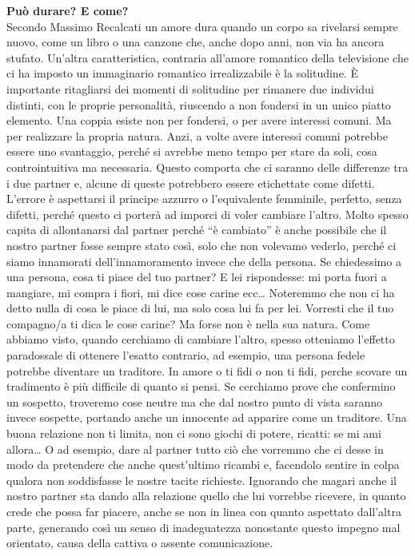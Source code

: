 \documentclass[12pt]{book} %
\begin{document}
\noindent \textbf{\large Può durare? E come?} \\
Secondo Massimo Recalcati un amore dura quando un corpo sa rivelarsi sempre nuovo, come un libro o una canzone che,
anche dopo anni, non via ha ancora stufato. Un'altra caratteristica, contraria
all'amore romantico della televisione che ci ha imposto un immaginario romantico irrealizzabile è
la solitudine. È importante ritagliarsi dei momenti di solitudine per rimanere due individui distinti, con le proprie
personalità, riuscendo a non fondersi in un unico piatto elemento. Una coppia esiste non per fondersi, o per avere
interessi comuni. Ma per realizzare la propria natura. Anzi, a volte avere interessi comuni potrebbe essere uno
svantaggio, perché si avrebbe meno tempo per stare da soli, cosa controintuitiva ma necessaria. Questo comporta che ci
saranno delle differenze tra i due partner e, alcune di queste potrebbero essere etichettate come difetti.
L'errore è aspettarsi il principe azzurro o l'equivalente femminile,
perfetto, senza difetti, perché questo ci porterà ad imporci di voler cambiare l'altro. Molto
spesso capita di allontanarsi dal partner perché “è cambiato” è anche possibile che il nostro partner fosse sempre stato così, solo che non
volevamo vederlo, perché ci siamo innamorati dell'innamoramento invece che della persona. Se
chiedessimo a una persona, cosa ti piace del tuo partner? E lei rispondesse: mi porta fuori a mangiare, mi compra i
fiori, mi dice cose carine ecc… Noteremmo che non ci ha detto nulla di cosa le piace di lui, ma solo cosa lui fa per
lei. 
Vorresti che il tuo compagno/a ti dica le cose carine? Ma forse non è nella sua natura.
Come abbiamo visto, quando cerchiamo di cambiare l'altro, spesso otteniamo
l'effetto paradossale di ottenere l'esatto contrario, ad esempio, una persona
fedele potrebbe diventare un traditore. In amore o ti fidi o non ti fidi, perche scovare un tradimento è più difficile di
quanto si pensi. Se cerchiamo prove che confermino un sospetto, troveremo cose neutre ma che dal nostro punto di vista
saranno invece sospette, portando anche un innocente ad apparire come un traditore. Una buona relazione non ti limita,
non ci sono giochi di potere, ricatti: se mi ami allora… O ad esempio, dare al partner tutto ciò che vorremmo che
ci desse in modo da pretendere che anche quest'ultimo ricambi e, facendolo sentire in colpa
qualora non soddisfasse le nostre tacite richieste. Ignorando che magari anche il nostro partner sta dando alla
relazione quello che lui vorrebbe ricevere, in quanto crede che possa far piacere, anche se non in linea con quanto
aspettato dall'altra parte, generando così un senso di inadeguatezza nonostante questo impegno mal
orientato, causa della cattiva o assente comunicazione.
\end{document}
